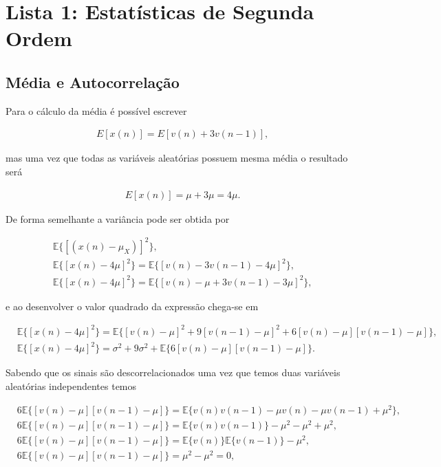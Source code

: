 \section{Lista 1: Estatísticas de Segunda Ordem} %


\subsection{Média e Autocorrelação} %
Para o cálculo da média é possível escrever
				
\begin{align}
    &E[x(n)] = E[v(n) + 3v(n-1)], 
\end{align}

mas uma vez que todas as variáveis aleatórias possuem mesma média o resultado será

\begin{align}
    &E[x(n)] = \mu + 3\mu = 4\mu.  
\end{align}

De forma semelhante a variância pode ser obtida por 

\begin{align}
    &\mathbb{E}\{[(x(n) - \mu_{X})]^2\}, \\
    &\mathbb{E}\{[x(n) - 4\mu]^2\} = \mathbb{E}\{[v(n) - 3v(n-1) -4\mu]^{2}\}, \\
    &\mathbb{E}\{[x(n) - 4\mu]^2\} = \mathbb{E}\{[v(n) - \mu + 3v(n-1) -3\mu]^{2}\},
\end{align}

e ao desenvolver o valor quadrado da expressão chega-se em

\begin{align}
    &\mathbb{E}\{[x(n) - 4\mu]^2\} = \mathbb{E}\{ [v(n) - \mu]^{2} + 9[v(n-1) - \mu]^{2} + 6[v(n) - \mu][v(n-1) - \mu] \}, \\
    &\mathbb{E}\{[x(n) - 4\mu]^2\} = \sigma^{2} + 9\sigma^{2} + \mathbb{E}\{6[v(n) - \mu][v(n-1) - \mu]\}.
\end{align}

Sabendo que os sinais são descorrelacionados uma vez que temos duas variáveis aleatórias independentes temos

\begin{align}
    &6\mathbb{E}\{[v(n) - \mu][v(n-1) - \mu]\} = \mathbb{E}\{v(n)v(n-1) - \mu v(n) -\mu v(n-1) + \mu^{2}\}, \\
    &6\mathbb{E}\{[v(n) - \mu][v(n-1) - \mu]\} = \mathbb{E}\{v(n)v(n-1)\} - \mu^{2} -\mu^{2} + \mu^{2}, \\
    &6\mathbb{E}\{[v(n) - \mu][v(n-1) - \mu]\} = \mathbb{E}\{v(n)\} \mathbb{E}\{v(n-1)\} - \mu^{2}, \\
    &6\mathbb{E}\{[v(n) - \mu][v(n-1) - \mu]\} = \mu^{2} - \mu^{2} = 0,
\end{align}

